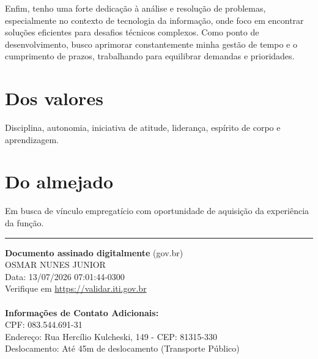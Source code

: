 \documentclass[a4paper,11pt]{article}
\begin{document}
Enfim, tenho uma forte dedicação à análise e resolução de problemas, especialmente no contexto de tecnologia da informação, onde foco em encontrar soluções eficientes para desafios técnicos complexos. Como ponto de desenvolvimento, busco aprimorar constantemente minha gestão de tempo e o cumprimento de prazos, trabalhando para equilibrar demandas e prioridades.

\section*{Dos valores}
Disciplina, autonomia, iniciativa de atitude, liderança, espírito de corpo e aprendizagem.

\section*{Do almejado}
Em busca de vínculo empregatício com oportunidade de aquisição da experiência da função.

\vspace{1cm}
\hrule
\vspace{0.3cm}
\small
\textbf{Documento assinado digitalmente} (gov.br) \\
OSMAR NUNES JUNIOR \\
Data: 13/07/2026 07:01:44-0300 \\
Verifique em \url{https://validar.iti.gov.br} \\
\\
\textbf{Informações de Contato Adicionais:} \\
CPF: 083.544.691-31 \\
Endereço: Rua Hercílio Kulcheski, 149 - CEP: 81315-330 \\
Deslocamento: Até 45m de deslocamento (Transporte Público)
\end{document}

